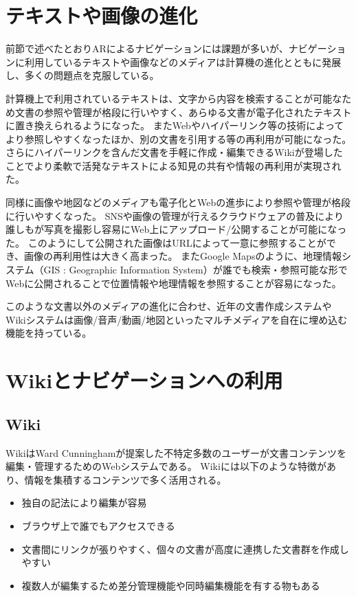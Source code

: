 \section{テキストや画像の進化}
前節で述べたとおりARによるナビゲーションには課題が多いが、ナビゲーションに利用しているテキストや画像などのメディアは計算機の進化とともに発展し、多くの問題点を克服している。

計算機上で利用されているテキストは、文字から内容を検索することが可能なため文書の参照や管理が格段に行いやすく、あらゆる文書が電子化されたテキストに置き換えられるようになった。
またWebやハイパーリンク等の技術によってより参照しやすくなったほか、別の文書を引用する等の再利用が可能になった。
さらにハイパーリンクを含んだ文書を手軽に作成・編集できるWiki\cite{Leuf2001TheWW}が登場したことでより柔軟で活発なテキストによる知見の共有や情報の再利用が実現された。

同様に画像や地図などのメディアも電子化とWebの進歩により参照や管理が格段に行いやすくなった。
SNSや画像の管理が行えるクラウドウェアの普及により誰しもが写真を撮影し容易にWeb上にアップロード/公開することが可能になった。
このようにして公開された画像はURLによって一意に参照することができ、画像の再利用性は大きく高まった。
またGoogle Mapsのように、地理情報システム（GIS : Geographic Information System）が誰でも検索・参照可能な形でWebに公開されることで位置情報や地理情報を参照することが容易になった。

このような文書以外のメディアの進化に合わせ、近年の文書作成システムやWikiシステムは画像/音声/動画/地図といったマルチメディアを自在に埋め込む機能を持っている。

\section{Wikiとナビゲーションへの利用}
\subsection{Wiki}
WikiはWard Cunninghamが提案した不特定多数のユーザーが文書コンテンツを編集・管理するためのWebシステムである。
Wikiには以下のような特徴があり、情報を集積するコンテンツで多く活用される。
\begin{itemize}
  \item 独自の記法により編集が容易
  \item ブラウザ上で誰でもアクセスできる
  \item 文書間にリンクが張りやすく、個々の文書が高度に連携した文書群を作成しやすい
  \item 複数人が編集するため差分管理機能や同時編集機能を有する物もある
\end{itemize}

